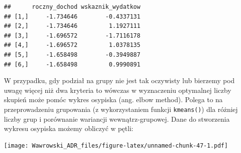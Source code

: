 \documentclass[]{book}
\newenvironment{Shaded}{\begin{snugshade}}{\end{snugshade}}
\newcommand{\CommentTok}[1]{\textcolor[rgb]{0.56,0.35,0.01}{\textit{#1}}}
\newcommand{\ControlFlowTok}[1]{\textcolor[rgb]{0.13,0.29,0.53}{\textbf{#1}}}
\newcommand{\DataTypeTok}[1]{\textcolor[rgb]{0.13,0.29,0.53}{#1}}
\newcommand{\DecValTok}[1]{\textcolor[rgb]{0.00,0.00,0.81}{#1}}
\newcommand{\KeywordTok}[1]{\textcolor[rgb]{0.13,0.29,0.53}{\textbf{#1}}}
\newcommand{\NormalTok}[1]{#1}
\newcommand{\OperatorTok}[1]{\textcolor[rgb]{0.81,0.36,0.00}{\textbf{#1}}}
\newcommand{\StringTok}[1]{\textcolor[rgb]{0.31,0.60,0.02}{#1}}
\begin{document}
\begin{Shaded}
\end{Shaded}

\begin{verbatim}
##      roczny_dochod wskaznik_wydatkow
## [1,]     -1.734646        -0.4337131
## [2,]     -1.734646         1.1927111
## [3,]     -1.696572        -1.7116178
## [4,]     -1.696572         1.0378135
## [5,]     -1.658498        -0.3949887
## [6,]     -1.658498         0.9990891
\end{verbatim}

W przypadku, gdy podział na grupy nie jest tak oczywisty lub bierzemy pod uwagę więcej niż dwa kryteria to wówczas w wyznaczeniu optymalnej liczby skupień może pomóc wykres osypiska (ang. elbow method). Polega to na przeprowadzeniu grupowania (z wykorzystaniem funkcji \texttt{kmeans()}) dla różniej liczby grup i porównanie wariancji wewnątrz-grupowej. Dane do stworzenia wykresu osypiska możemy obliczyć w pętli:

\begin{Shaded}
\end{Shaded}

\texttt{[image: Wawrowski\_ADR\_files/figure-latex/unnamed-chunk-47-1.pdf]}
\end{document}
